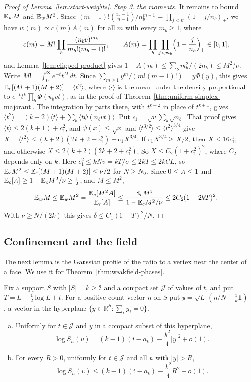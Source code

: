 \begin{proof}[Proof of Lemma~\ref{lem:start-weights}]
\emph{Step 3: the moments.} It remains to bound $\mathbb E_wM$ and $\mathbb E_wM^2$. Since
$(m-1)!\binom{n_b-1}{m-1}/n_b^{m-1}=\prod_{j<m}(1-j/n_b)_+$, we have
$w(m)\propto c(m)A(m)$ for all $m$ with every $m_b\ge1$, where
\[
 c(m)=M!\prod_b\frac{(n_bv)^{m_b}}{m_b!(m_b-1)!},\qquad
 A(m)=\prod_b\prod_{j<m_b}\Bigl(1-\frac j{n_b}\Bigr)_+\in[0,1],
\]
and Lemma~\ref{lem:clipped-product} gives $1-A(m)\le\sum_bm_b^2/(2n_b)\le M^2/\nu$.
Write $M!=\int_0^\infty e^{-t}t^M\,dt$. Since
$\sum_{m\ge1}y^m/(m!(m-1)!)=y\Phi(y)$, this gives
$\mathbb E_c[(M+1)(M+2)]=\langle t^2\rangle$, where $\langle\cdot\rangle$ is the mean
under the density proportional to $e^{-t}t^k\prod_b\Phi(n_bvt)$, as in the
proof of Theorem~\ref{thm:uniform-simplex-majorant}. The integration by parts
there, with $t^{k+2}$ in place of $t^{k+1}$, gives
$\langle t^2\rangle=(k+2)\langle t\rangle+\sum_b\langle t\psi(n_bvt)\rangle$. Put
$c_1=\sqrt v\sum_b\sqrt{n_b}$. That proof gives
$\langle t\rangle\le2(k+1)+c_1^2$, and $\psi(x)\le\sqrt x$ and
$\langle t^{3/2}\rangle\le\langle t^2\rangle^{3/4}$ give
$X=\langle t^2\rangle\le(k+2)(2k+2+c_1^2)+c_1X^{3/4}$. If $c_1X^{3/4}\ge X/2$,
then $X\le16c_1^4$, and otherwise $X\le2(k+2)(2k+2+c_1^2)$. So
$X\le C_2(1+c_1^2)^2$, where $C_2$ depends only on $k$. Here
$c_1^2\le kNv=kT/\sigma\le2kT\le2kCL$, so
$\mathbb E_cM^2\le\mathbb E_c[(M+1)(M+2)]\le\nu/2$ for $N\ge N_0$. Since $0\le A\le1$ and
$\mathbb E_c[A]\ge1-\mathbb E_cM^2/\nu\ge\frac12$, and $M\le M^2$,
\[
 \mathbb E_wM\le\mathbb E_wM^2=\frac{\mathbb E_c[M^2A]}{\mathbb E_c[A]}
 \le\frac{\mathbb E_cM^2}{1-\mathbb E_cM^2/\nu}\le2C_2(1+2kT)^2.
\]
With $\nu\ge N/(2k)$ this gives $\delta\le C_1(1+T)^2/N$.
\end{proof}

\subsection{Confinement and the field}

The next lemma is the Gaussian profile of the ratio to a vertex near the center
of a face. We use it for Theorem~\ref{thm:weakfield-phases}.

\begin{lemma}\label{lem:confinement}
Fix a support $S$ with $|S|=k\ge2$ and a compact set $\mathcal J$ of values of
$t$, and put $T=L-\frac12\log L+t$. For a positive count vector $n$ on $S$ put
$y=\sqrt L\,(n/N-\frac1k\mathbf1)$, a vector in the hyperplane
$\{y\in\mathbb R^S:\sum_iy_i=0\}$.
\begin{enumerate}[(a)]
\item Uniformly for $t\in\mathcal J$ and $y$ in a compact subset of this
hyperplane,
\[
 \log S_n(u)=(k-1)(t-a_k)-\frac{k^2}4|y|^2+o(1).
\]
\item For every $R>0$, uniformly for $t\in\mathcal J$ and all $n$ with $|y|>R$,
\[
 \log S_n(u)\le(k-1)(t-a_k)-\frac{k^2}4R^2+o(1).
\]
\end{enumerate}
\end{lemma}

